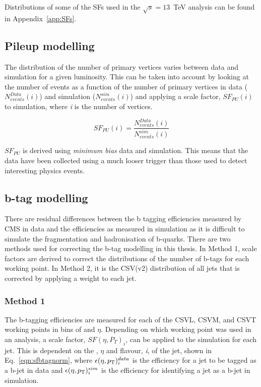 Distributions of some of the SFs used in the $\sqrt{s}=13$~TeV analysis can be found in Appendix~\ref{app:SFs}.


\subsection{Pileup modelling}
\label{sec:pile-up}
The distribution of the number of primary vertices varies between data and simulation for a given luminosity. This can be taken into account by looking at the number of events as a function of the number of primary vertices in data (${N_{events}^{Data}(i)}$) and simulation (${N_{events}^{sim}(i)}$) and applying a scale factor, $SF_{PU}\left( i \right)$ to simulation, where \emph{i} is the number of vertices.

\begin{equation}
SF_{PU}\left( i \right) = \frac{N_{events}^{Data}(i)}{N_{events}^{sim}(i)} 
\label{eqn:PUSF}
\end{equation}

$SF_{PU}$ is derived using \emph{minimum bias} data and simulation. This means that the data have been collected using a much looser trigger than those used to detect interesting physics events. 

\subsection{b-tag modelling ~\label{sec:btagModelling}}
There are residual differences between the b tagging efficiencies measured by CMS in data and the efficiencies as measured in simulation as it is difficult to simulate the fragmentation and hadronisation of b-quarks. There are two methods used for correcting the b-tag modelling in this thesis. In Method 1, scale factors are derived to correct the distributions of the number of b-tags for each working point. In Method 2, it is the CSV(v2) distribution of all jets that is corrected by applying a weight to each jet.

\subsubsection{Method 1 ~\label{subsec:method1btag}}

The b-tagging efficiencies are measured for each of the CSVL, CSVM, and CSVT working points in bins of \pt and $\eta$. Depending on which working point was used in an analysis, a scale factor, $SF(\eta, P_{T})_{i}$,  can be applied to the simulation for each jet. This is dependent on the \pt, $\eta$ and flavour, \emph{i}, of the jet, shown in Eq.~\ref{eqn:sfbtagnorm}, where $\epsilon(\eta , p_{\mathrm{T}})^{data}_{i}$ is the efficiency for a jet to be tagged as a b-jet in data and $\epsilon(\eta , p_{\mathrm{T}})^{sim}_{i}$ is the efficiency for identifying a jet as a b-jet in simulation.

